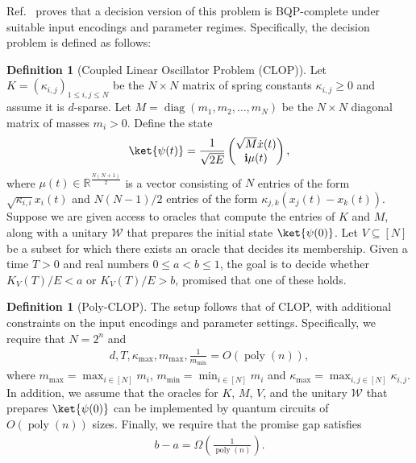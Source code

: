 \documentclass[superscriptaddress,onecolumn,nofootinbib,longbibliography,a4paper,accepted=2026-09-29]{quantumarticle}
\theoremstyle{plain}
\theoremstyle{definition}
\newtheorem{definition}[thm]{Definition}
\numberwithin{thm}{section}
\numberwithin{assumption}{section}
\numberwithin{lemma}{section}
\numberwithin{prop}{section}
\numberwithin{cor}{section}
\numberwithin{definition}{section}
\numberwithin{rmk}{section}
\numberwithin{equation}{section}
\newcommand{\lrb}[1]{\left ( #1 \right )}
\renewcommand{\i}{\ensuremath{\mathbf{i}}}
\newcommand{\myO}[1]{O\lrb{#1}}
\newcommand{\myOmega}[1]{\Omega\lrb{#1}}
\newcommand{\diag}[1]{\operatorname{diag}\lrb{#1}}
\begin{document}
Ref.~\cite{babbush2023exponential} proves that a decision version of this problem is BQP-complete under suitable input encodings and parameter regimes. Specifically, the decision problem is defined as follows:
\begin{definition}[Coupled Linear Oscillator Problem (CLOP)]
Let $K=(\kappa_{i,j})_{1\le i,j\le N}$ be the $N\times N$ matrix of spring constants $\kappa_{i,j} \ge 0$ and assume it is $d$-sparse. Let $M=\diag{m_1,m_2,\dots,m_N}$ be the $N \times N$ diagonal matrix of masses $m_i>0$. Define the state 
\begin{align}
\ket{\psi(t)}=\frac{1}{\sqrt{2E}}\begin{pmatrix}
    \sqrt{M}\dot{x}(t) \\
    \i \mu(t)
\end{pmatrix},
\end{align}
where $\mu(t) \in \mathbb{R}^{\frac{N(N+1)}{2}}$ is a vector consisting of $N$ entries of the form $\sqrt{\kappa_{i,i}}x_i(t)$ and $N(N-1)/2$ entries  of the form $\kappa_{j,k}(x_j(t)-x_k(t))$. Suppose we are given access to oracles that compute the entries of $K$ and $M$, along with a unitary $\mathcal{W}$ that prepares the initial state $\ket{\psi(0)}$. 
Let $V \subseteq [N]$ be a subset for which there exists an oracle that decides its membership. Given a time $T>0$ and real numbers $0\le a < b \le 1$, the goal is to decide whether $K_V(T)/E < a$ or $K_V(T)/E > b$, promised that one of these holds.
\end{definition}

\begin{definition}[Poly-CLOP]
The setup follows that of CLOP, with additional constraints on the input encodings and parameter settings. Specifically, we require that $N=2^n$ and 
\begin{align}
d, T, \kappa_{\max}, m_{\max}, \frac{1}{m_{\min}} = \myO{\operatorname{poly}(n)},
\end{align}
where $m_{\max} = \max_{i \in [N]} m_i$, $m_{\min} = \min_{i \in [N]} m_i$ and $\kappa_{\max} = \max_{i,j \in [N]} \kappa_{i,j}$. In addition, we assume that the oracles for $K$, $M$, $V$, and the unitary $\mathcal{W}$ that prepares $\ket{\psi(0)}$ can be implemented by quantum circuits of  $\myO{\operatorname{poly}(n)}$ sizes. Finally, we require that the promise gap satisfies 
\begin{align}
b - a = \myOmega{\frac{1}{\operatorname{poly}(n)}}.    
\end{align}
\end{definition}
\end{document}
